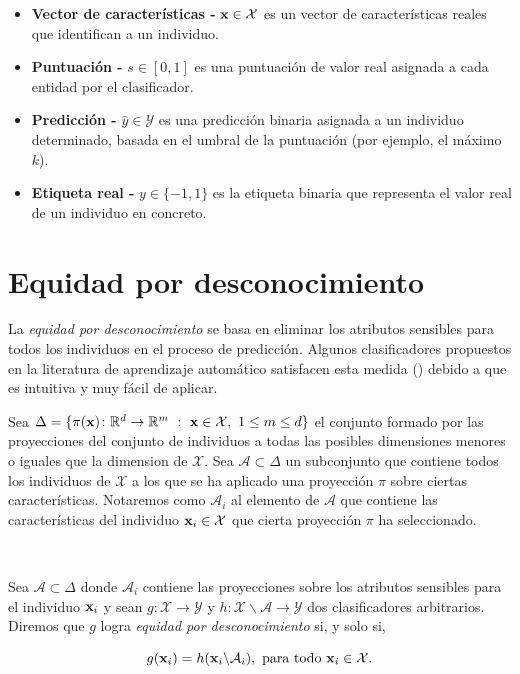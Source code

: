 \documentclass[oneside,openright,titlepage,numbers=noenddot,openany,headinclude,footinclude=true,
cleardoublepage=empty,abstractoff,BCOR=5mm,paper=a4,fontsize=12pt,main=spanish]{scrreprt}
\begin{document}
\begin{itemize}
    \item \textbf{Vector de características -} $\textbf{x}\in \mathcal{X}$ es un vector de características reales que identifican a un individuo.
    \item \textbf{Puntuación -} $s \in [0,1]$ es una puntuación de valor real asignada a cada entidad por el clasificador.
    \item \textbf{Predicción -} $\hat{y} \in \mathcal{Y}$ es una predicción binaria asignada a un individuo determinado, basada en el umbral de la puntuación (por ejemplo, el máximo $k$).
    \item \textbf{Etiqueta real -} $y \in \{-1,1\}$ es la etiqueta binaria que representa el valor real de un individuo en concreto.
\end{itemize}

\section{Equidad por desconocimiento}

\label{sec:eqdesconocimiento}

La \textit{equidad por desconocimiento} se basa en eliminar los atributos sensibles para todos los individuos en el proceso de predicción. Algunos clasificadores propuestos en la literatura de aprendizaje automático satisfacen esta medida (\cite{detect2012}) debido a que es intuitiva y muy fácil de aplicar.

\begin{notation}
Sea $\Delta=\{ \pi(\textbf{x})\colon \mathbb{R}^d \to \mathbb{R}^m  \ : \ \textbf{x} \in \mathcal{X}, \ 1 \leq m \leq d\}$ el conjunto formado por las proyecciones del conjunto de individuos a todas las posibles dimensiones menores o iguales que la dimension de $\mathcal{X}$. Sea $\mathcal{A} \subset \Delta$ un subconjunto que contiene todos los individuos de $\mathcal{X}$ a los que se ha aplicado una proyección $\pi$ sobre ciertas características. Notaremos como $\mathcal{A}_i$ al elemento de $\mathcal{A}$ que contiene las características del individuo $\textbf{x}_i\in \mathcal{X}$ que cierta proyección $\pi$ ha seleccionado.
\end{notation}\

\begin{definition}
Sea $\mathcal{A} \subset \Delta$ donde $\mathcal{A}_i$ contiene las proyecciones sobre los atributos sensibles para el individuo $\textbf{x}_i$ y sean $g\colon \mathcal{X} \to \mathcal{Y}$ y $h\colon \mathcal{X}\backslash \mathcal{A} \to \mathcal{Y}$ dos clasificadores arbitrarios. Diremos que $g$ logra \textit{equidad por desconocimiento} si, y solo si, 

\begin{equation*} 
g(\textbf{x}_i)=h(\textbf{x}_i \backslash \mathcal{A}_i), \ \text{para todo} \ \textbf{x}_i \in \mathcal{X}.
\end{equation*}
\end{definition}\
\end{document}
